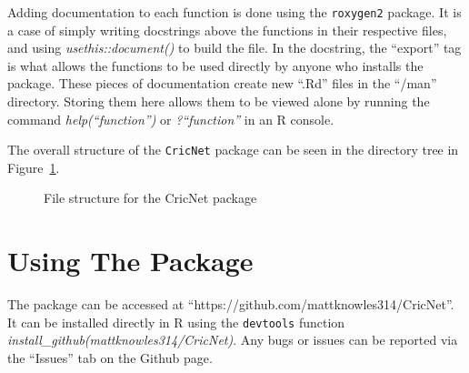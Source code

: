 Adding documentation to each function is done using the \verb|roxygen2| package. It is a case of simply writing docstrings above the functions in their respective files, and using \textit{usethis::document()} to build the file. In the docstring, the ``export'' tag is what allows the functions to be used directly by anyone who installs the package.  
These pieces of documentation create new ``.Rd'' files in the ``/man'' directory. Storing them here allows them to be viewed alone by running the command \textit{help(``function'')} or \textit{?``function''} in an R console. 

The overall structure of the \verb|CricNet| package can be seen in the directory tree in Figure~\ref{cricnetstruct}.\\

\begin{figure}[ht]
\caption{File structure for the CricNet package}

    

\label{cricnetstruct}
\end{figure}

\section{Using The Package}
The package can be accessed at ``https://github.com/mattknowles314/CricNet''. It can be installed directly in R using the \verb|devtools| function \textit{install\_github(mattknowles314/CricNet)}. Any bugs or issues can be reported via the ``Issues'' tab on the Github page. 

